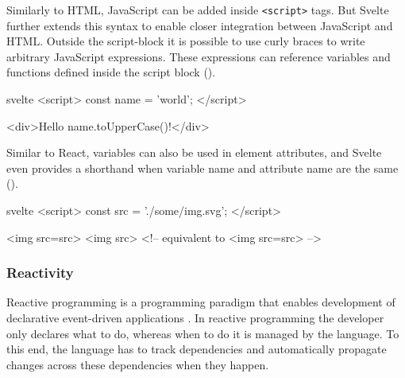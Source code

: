 Similarly to HTML, JavaScript can be added inside \texttt{<script>} tags. But Svelte further extends this syntax to enable closer integration between JavaScript and HTML. Outside the script-block it is possible to use curly braces to write arbitrary JavaScript expressions. These expressions can reference variables and functions defined inside the script block ().


\begin{listing}[h!]
\begin{myminted}{svelte}{}
<script>
  const name = 'world';
</script>

<div>Hello {name.toUpperCase()}!</div>
\end{myminted}
\caption{Example for JavaScript expressions in Svelte.}
\label{fig:svelte-javascript-expression}
\end{listing}

Similar to React, variables can also be used in element attributes, and Svelte even provides a shorthand when variable name and attribute name are the same ().

\begin{listing}[h!]
\begin{myminted}{svelte}{}
<script>
  const src = './some/img.svg';
</script>

<img src={src}>
<img {src}> <!-- equivalent to <img src={src}> -->
\end{myminted}
\caption{Syntax for using variables in element attributes.}
\label{fig:svelte-attribute-variables}
\end{listing}

\subsubsection{Reactivity}
\label{sec:svelte-reactivity}

Reactive programming is a programming paradigm that enables development of declarative event-driven applications \cite{bainomugisha_survey_2013}. In reactive programming the developer only declares what to do, whereas when to do it is managed by the language. To this end, the language has to track dependencies and automatically propagate changes across these dependencies when they happen.

